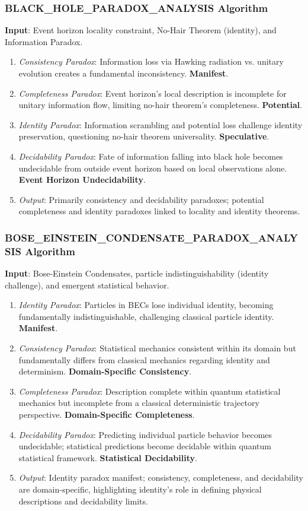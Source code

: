 	\subsubsection{BLACK\_HOLE\_PARADOX\_ANALYSIS Algorithm}
	\textbf{Input}: Event horizon locality constraint, No-Hair Theorem (identity), and Information Paradox.
	\begin{enumerate}
		\item \textit{Consistency Paradox}: Information loss via Hawking radiation vs. unitary evolution creates a fundamental inconsistency. \textbf{Manifest}.
		\item \textit{Completeness Paradox}: Event horizon's local description is incomplete for unitary information flow, limiting no-hair theorem's completeness. \textbf{Potential}.
		\item \textit{Identity Paradox}: Information scrambling and potential loss challenge identity preservation, questioning no-hair theorem universality. \textbf{Speculative}.
		\item \textit{Decidability Paradox}:  Fate of information falling into black hole becomes undecidable from outside event horizon based on local observations alone. \textbf{Event Horizon Undecidability}.
		\item \textit{Output}: Primarily consistency and decidability paradoxes; potential completeness and identity paradoxes linked to locality and identity theorems.
	\end{enumerate}
	
	\subsubsection{BOSE\_EINSTEIN\_CONDENSATE\_PARADOX\_ANALYSIS Algorithm}
	\textbf{Input}: Bose-Einstein Condensates, particle indistinguishability (identity challenge), and emergent statistical behavior.
	\begin{enumerate}
		\item \textit{Identity Paradox}:  Particles in BECs lose individual identity, becoming fundamentally indistinguishable, challenging classical particle identity. \textbf{Manifest}.
		\item \textit{Consistency Paradox}:  Statistical mechanics consistent within its domain but fundamentally differs from classical mechanics regarding identity and determinism. \textbf{Domain-Specific Consistency}.
		\item \textit{Completeness Paradox}:  Description complete within quantum statistical mechanics but incomplete from a classical deterministic trajectory perspective. \textbf{Domain-Specific Completeness}.
		\item \textit{Decidability Paradox}: Predicting individual particle behavior becomes undecidable; statistical predictions become decidable within quantum statistical framework. \textbf{Statistical Decidability}.
		\item \textit{Output}: Identity paradox manifest; consistency, completeness, and decidability are domain-specific, highlighting identity's role in defining physical descriptions and decidability limits.
	\end{enumerate}
	
